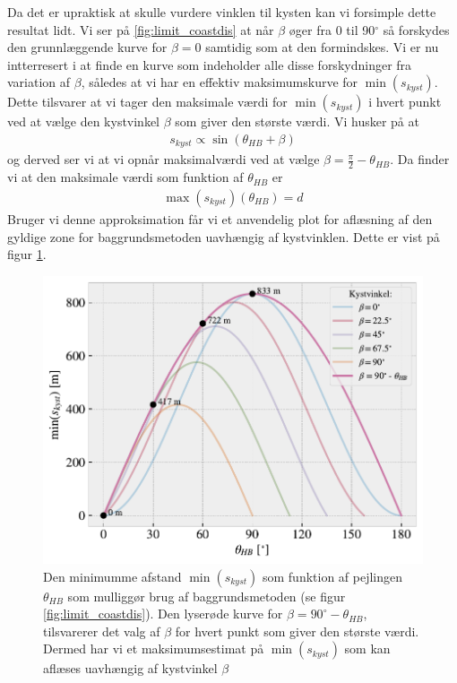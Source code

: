 \documentclass[%
 reprint,
nofootinbib,
aps,
]{revtex4-1}
\begin{document}
Da det er upraktisk at skulle vurdere vinklen til kysten kan vi forsimple dette resultat lidt. Vi ser på \ref{fig:limit_coastdis} at når $\beta$ øger fra 0 til 90$^{\circ}$ så forskydes den grunnlæggende kurve for $\beta = 0$ samtidig som at den formindskes. Vi er nu intterresert i at finde en kurve som indeholder alle disse forskydninger fra variation af $\beta$, således at vi har en effektiv maksimumskurve for $\min{(s_{kyst})}$. Dette tilsvarer at vi tager den maksimale værdi for $\min{(s_{kyst})}$ i hvert punkt ved at vælge den kystvinkel $\beta$ som giver den største værdi. Vi husker på at
\begin{align*}
  s_{kyst} \propto \sin{(\theta_{HB} + \beta)}
\end{align*}
og derved ser vi at vi opnår maksimalværdi ved at vælge $\beta = \frac{\pi}{2} - \theta_{HB}$. Da finder vi at den maksimale værdi som funktion af $\theta_{HB}$ er
\begin{align}
  \max{(s_{kyst})}(\theta_{HB}) = d
  \label{eq:max_s_kyst}
\end{align}
Bruger vi denne approksimation får vi et anvendelig plot for aflæsning af den gyldige zone for baggrundsmetoden uavhængig af kystvinklen. Dette er vist på figur \ref{fig:limit_coastdis_betamax}.
\begin{figure}[H]
  \includegraphics[width=\linewidth]{figures/limit_coastdis_betamax.pdf}
  \caption{Den minimumme afstand $\min{(s_{kyst})}$ som funktion af pejlingen $\theta_{HB}$ som mulliggør brug af baggrundsmetoden (se figur \ref{fig:limit_coastdis}). Den lyserøde kurve for $\beta = 90^{\circ} - \theta_{HB}$, tilsvarerer det valg af $\beta$ for hvert punkt som giver den største værdi. Dermed har vi et maksimumsestimat på $\min{(s_{kyst})}$ som kan aflæses uavhængig af kystvinkel $\beta$ }
  \label{fig:limit_coastdis_betamax}
\end{figure}
\end{document}
